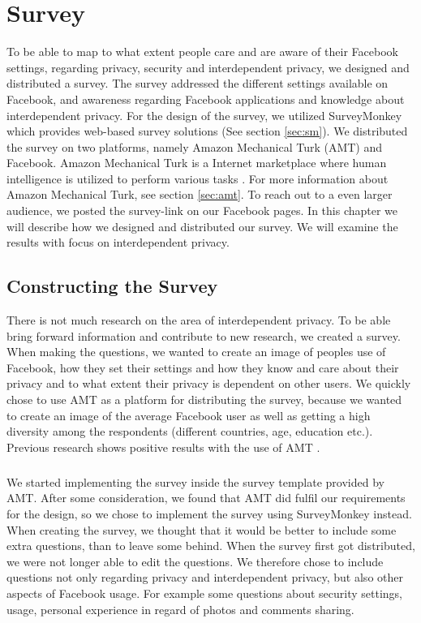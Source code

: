 \chapter{Survey}
\label{chp:amtsurvey} 

To be able to map to what extent people care and are aware of their Facebook settings, regarding privacy, security and interdependent privacy, we designed and distributed a survey. The survey addressed the different settings available on Facebook, and awareness regarding Facebook applications and knowledge about interdependent privacy. For the design of the survey, we utilized SurveyMonkey which provides web-based survey solutions (See section \ref{sec:sm}). We distributed the survey on two platforms, namely Amazon Mechanical Turk (AMT) and Facebook. Amazon Mechanical Turk is a Internet marketplace where human intelligence is utilized to perform various tasks \cite{amazonweb}. For more information about Amazon Mechanical Turk, see section \ref{sec:amt}. To reach out to a even larger audience, we posted the survey-link on our Facebook pages. In this chapter we will describe how we designed and distributed our survey. We will examine the results with focus on interdependent privacy. 


\section{Constructing the Survey}
There is not much research on the area of interdependent privacy. To be able bring forward information and contribute to new research, we created a survey. When making the questions, we wanted to create an image of peoples use of Facebook, how they set their settings and how they know and care about their privacy and to what extent their privacy is dependent on other users. We quickly chose to use AMT as a platform for distributing the survey, because we wanted to create an image of the average Facebook user as well as getting a high diversity among the respondents (different countries, age, education etc.). Previous research shows positive results with the use of AMT \cite{expectations,incentivesAmt}. 

\paragraph{}
We started implementing the survey inside the survey template provided by AMT. After some consideration, we found that AMT did fulfil our requirements for the design, so we chose to implement the survey using SurveyMonkey instead. When creating the survey, we thought that it would be better to include some extra questions, than to leave some behind. When the survey first got distributed, we were not longer able to edit the questions. We therefore chose to include questions not only regarding privacy and interdependent privacy, but also other aspects of Facebook usage. For example some questions about security settings, usage, personal experience in regard of photos and comments sharing.

